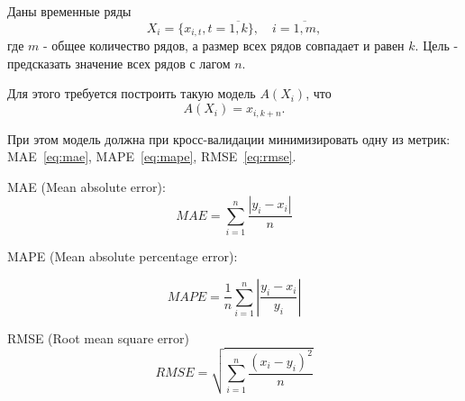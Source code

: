 \documentclass[a4paper,article,14pt]{extarticle}
\begin{document}
\pagebreak
{}

Даны временные ряды
\begin{equation}
    {X_{i} = \{x_{i,t}, t=\overline{1,k}\},\quad i=\overline{1,m}},
    \label{eq:equation}
\end{equation}
где $m$ - общее количество рядов, а размер всех рядов совпадает и равен $k$.
Цель - предсказать значение всех рядов с лагом $n$.

Для этого требуется построить такую модель $A(X_i)$, что
\begin{equation}
    A(X_i)=x_{i, k+n}.
    \label{eq:equation2}
\end{equation}

При этом модель должна при кросс-валидации минимизировать одну из метрик: MAE~\eqref{eq:mae}, MAPE~\eqref{eq:mape}, RMSE~\eqref{eq:rmse}.

MAE (Mean absolute error):
\begin{equation}
    MAE = \sum_{i=1}^{n} \frac{|y_i - x_i|}{n}
    \label{eq:mae}
\end{equation}

MAPE (Mean absolute percentage error):

\begin{equation}
    MAPE = \frac{1}{n} \sum_{i=1}^{n} \left| \frac{y_i - x_i}{y_i} \right|
    \label{eq:mape}
\end{equation}

RMSE (Root mean square error)
\begin{equation}
    RMSE = \sqrt{\sum_{i=1}^{n} \frac{(x_i - y_i) ^ 2}{n}}
    \label{eq:rmse}
\end{equation}

\pagebreak
{}
\end{document}
